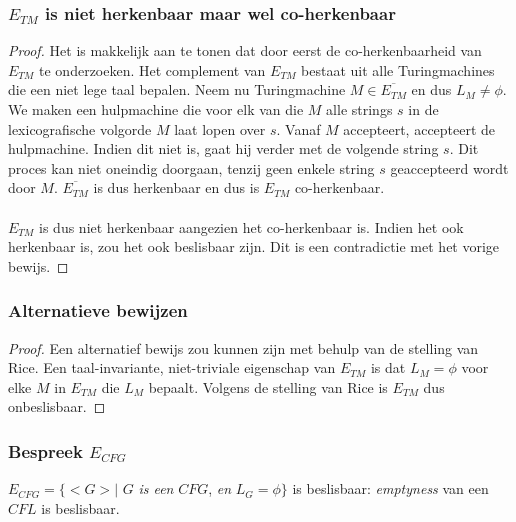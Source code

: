 \subsubsection*{$E_{TM}$ is niet herkenbaar maar wel co-herkenbaar}

\begin{proof}
	Het is makkelijk aan te tonen dat door eerst de co-herkenbaarheid van $E_{TM}$ te onderzoeken. Het complement van $E_{TM}$ bestaat uit alle Turingmachines die een niet lege taal bepalen. Neem nu Turingmachine $M \in \overline{E_{TM}}$ en dus $L_M \neq \phi$. We maken een hulpmachine die voor elk van die $M$ alle strings $s$ in de lexicografische volgorde $M$ laat lopen over $s$. Vanaf $M$ accepteert, accepteert de hulpmachine. Indien dit niet is, gaat hij verder met de volgende string $s$.
	Dit proces kan niet oneindig doorgaan, tenzij geen enkele string $s$ geaccepteerd wordt door $M$. $\overline{E_{TM}}$ is dus herkenbaar en dus is $E_{TM}$ co-herkenbaar.
	\\\\
	$E_{TM}$ is dus niet herkenbaar aangezien het co-herkenbaar is. Indien het ook herkenbaar is, zou het ook beslisbaar zijn. Dit is een contradictie met het vorige bewijs.
\end{proof}

\subsubsection*{Alternatieve bewijzen}

\begin{proof}
	Een alternatief bewijs zou kunnen zijn met behulp van de stelling van Rice. Een taal-invariante, niet-triviale eigenschap van $E_{TM}$ is dat $L_M = \phi$ voor elke $M$ in $E_{TM}$ die $L_M$ bepaalt. Volgens de stelling van Rice is $E_{TM}$ dus onbeslisbaar.
\end{proof}

\subsubsection*{Bespreek $E_{CFG}$}

\begin{theorem}
	$E_{CFG} = \{ <G> |$ $G$ \textit{is een} $CFG$, \textit{en} $L_G = \phi \}$ is beslisbaar: \textit{emptyness} van een $CFL$ is beslisbaar.
\end{theorem}

